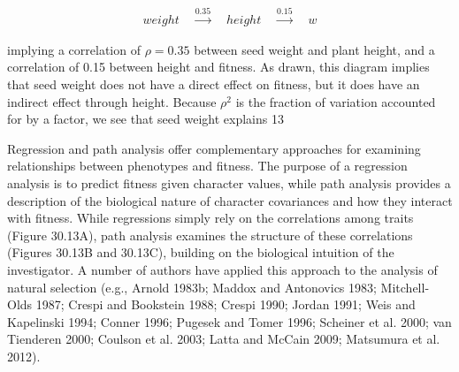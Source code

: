 \documentclass{article}
\begin{document}
\begin{equation}
\begin{aligned}weight\quad\xrightarrow{0.35}\quad height\quad\xrightarrow{0.15}\quad w\end{aligned}
\end{equation}

implying a correlation of  $ \rho = 0.35 $ between seed weight and plant height, and a correlation of 0.15 between height and fitness. As drawn, this diagram implies that seed weight does not have a direct effect on fitness, but it does have an indirect effect through height. Because  $ \rho^2 $ is the fraction of variation accounted for by a factor, we see that seed weight explains 13%

Regression and path analysis offer complementary approaches for examining relationships between phenotypes and fitness. The purpose of a regression analysis is to predict fitness given character values, while path analysis provides a description of the biological nature of character covariances and how they interact with fitness. While regressions simply rely on the correlations among traits (Figure 30.13A), path analysis examines the structure of these correlations (Figures 30.13B and 30.13C), building on the biological intuition of the investigator. A number of authors have applied this approach to the analysis of natural selection (e.g., Arnold 1983b; Maddox and Antonovics 1983; Mitchell-Olds 1987; Crespi and Bookstein 1988; Crespi 1990; Jordan 1991; Weis and Kapelinski 1994; Conner 1996; Pugesek and Tomer 1996; Scheiner et al. 2000; van Tienderen 2000; Coulson et al. 2003; Latta and McCain 2009; Matsumura et al. 2012).
\end{document}

